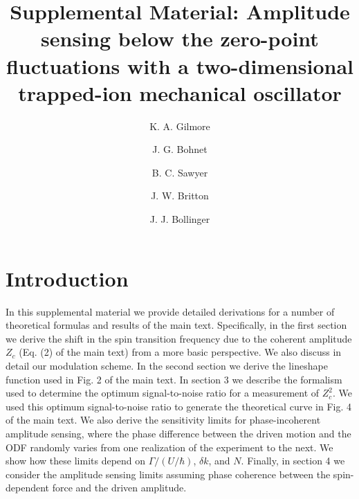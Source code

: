 \documentclass[aps,prl,onecolumn,superscriptaddress,floatfix]{revtex4-1}
\begin{document}
\title{Supplemental Material: Amplitude sensing below the zero-point fluctuations with a two-dimensional trapped-ion mechanical oscillator}
\author{K. A. Gilmore}


\author{J. G. Bohnet}

\author{B. C. Sawyer}

\author{J. W. Britton}

\author{J. J. Bollinger}
\maketitle

\section*{Introduction}
In this supplemental material we provide detailed derivations for a number of theoretical formulas and results of the main text. Specifically, in the first section we derive  the shift in the spin transition frequency due to the coherent amplitude $Z_c$ (Eq. (2) of the main text) from a more basic perspective. We also discuss in detail our modulation scheme. In the second section we derive the lineshape function used in Fig. 2 of the main text. In section 3 we describe the formalism used to determine the optimum signal-to-noise ratio for a measurement of $Z_{c}^2$. We used this optimum signal-to-noise ratio to generate the theoretical curve in Fig. 4 of the main text. We also derive the sensitivity limits for phase-incoherent amplitude sensing, where the phase difference between the driven motion and the ODF randomly varies from one realization of the experiment to the next. We show how these limits depend on $\Gamma/(U/\hbar)$, $\delta k$, and $N$. Finally, in section 4 we consider the amplitude sensing limits assuming phase coherence between the spin-dependent force and the driven amplitude. 
\end{document}
